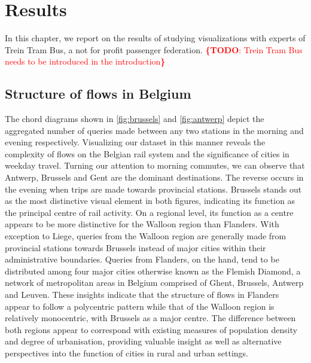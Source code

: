\documentclass{sig-alternate}
\newcommand{\todo}[1]{\noindent\textcolor{red}{{\bf \{TODO}: #1{\bf \}}}}
\begin{document}
\section{Results}
\label{sec:results}

In this chapter, we report on the results of studying visualizations with experts of Trein Tram Bus, a not for profit passenger federation. \todo{Trein Tram Bus needs to be introduced in the introduction}

\subsection{Structure of flows in Belgium}

The chord diagrams shown in \cref{fig:brussels} and \cref{fig:antwerp} depict the aggregated number of queries made between any two stations in the morning and evening respectively. 
Visualizing our dataset in this manner reveals the complexity of flows on the Belgian rail system and the significance of cities in weekday travel.
Turning our attention to morning commutes, we can observe that Antwerp, Brussels and Gent are the dominant destinations.
The reverse occurs in the evening when trips are made towards provincial stations.
Brussels stands out as the most distinctive visual element in both figures, indicating its function as the principal centre of rail activity.
On a regional level, its function as a centre appears to be more distinctive for the Walloon region than Flanders.
With exception to Liege, queries from the Walloon region are generally made from provincial stations towards Brussels instead of major cities within their administrative boundaries. 
Queries from Flanders, on the hand, tend to be distributed among four major cities otherwise known as the Flemish Diamond, a network of metropolitan areas in Belgium comprised of Ghent, Brussels, Antwerp and Leuven. 
These insights indicate that the structure of flows in Flanders appear to follow a polycentric pattern while that of the Walloon region is relatively monocentric, with   Brussels as a major centre.
The difference between both regions appear to correspond with existing measures of population density and degree of urbanisation, providing valuable insight as well as alternative perspectives into the function of cities in rural and urban settings.
\end{document}
